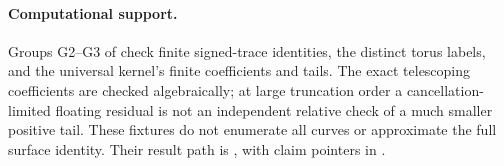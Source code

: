 \paragraph{Computational support.}
Groups G2--G3 of 
check finite signed-trace identities, the distinct torus labels,
and the universal kernel's finite coefficients and tails.
The exact telescoping coefficients are checked algebraically;
at large truncation order a cancellation-limited floating residual
is not an independent relative check of a much smaller positive tail.
These fixtures do not enumerate all curves or approximate the full
surface identity. Their result path is
, with claim pointers in
.
